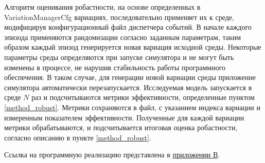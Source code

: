             Алгоритм оценивания робастности, на основе определенных в \newline VariationManagerCfg вариациях, последовательно применяет их к среде, модифицируя конфигурационный файл диспетчера событий. В начале каждого эпизода применяются рандомизации согласно заданным параметрам, таким образом каждый эпизод генерируется новая вариация исходной среды. Некоторые параметры среды определяются при запуске симулятора и не могут быть изменены в процессе, не нарушив стабильность работы программного обеспечения. В таком случае, для генерации новой вариации среды приложение симулятора автоматически перезапускается. Исследуемая модель запускается в среде $N$ раз и подсчитываются метрики эффективности, определенные пунктом \ref{method_robust}. Метрики сохраняются в файл, с указанием индекса вариации и измеренным показателем эффективности. Полученные для каждой вариации метрики обрабатываются, и подсчитывается итоговая оценка робастности, согласно описанию в пункте \ref{method_robust}.
        
            Ссылка на программную реализацию представлена в \hyperref[sec:program]{приложении В}.
